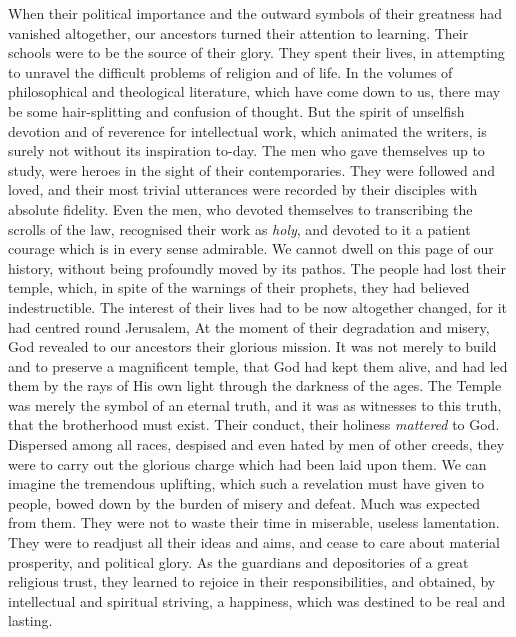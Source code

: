 When their political importance and the
outward symbols of their greatness had
vanished altogether, our ancestors turned
their attention to learning. Their schools
were to be the source of their glory. They
spent their lives, in attempting to unravel the
difficult problems of religion and of life. In
the volumes of philosophical and theological
literature, which have come down to us,
there may be some hair-splitting and confusion
of thought. But the spirit of unselfish
devotion and of reverence for intellectual
work, which animated the writers, is surely
not without its inspiration to-day. The
men who gave themselves up to study, were
heroes in the sight of their contemporaries.
They were followed and loved, and their
most trivial utterances were recorded by
their disciples with absolute fidelity. Even
the men, who devoted themselves to transcribing
the scrolls of the law, recognised
their work as \textsl{holy}, and devoted to it a
patient courage which is in every sense
admirable. We cannot dwell on this page
of our history, without being profoundly
moved by its pathos. The people had lost
their temple, which, in spite of the warnings
of their prophets, they had believed
indestructible. The interest of their lives had
to be now altogether changed, for it had
centred round Jerusalem, At the moment of
their degradation and misery, God revealed to
our ancestors their glorious mission. It was
not merely to build and to preserve a
magnificent temple, that God had kept them
alive, and had led them by the rays of His
own light through the darkness of the ages.
The Temple was merely the symbol of an
eternal truth, and it was as witnesses to this
truth, that the brotherhood must exist.
Their conduct, their holiness \textsl{mattered} to
God. Dispersed among all races, despised
and even hated by men of other creeds,
they were to carry out the glorious charge
which had been laid upon them. We can
imagine the tremendous uplifting, which
such a revelation must have given to people,
bowed down by the burden of misery and
defeat. Much was expected from them.
They were not to waste their time in
miserable, useless lamentation. They were to
readjust all their ideas and aims, and cease
to care about material prosperity, and political
glory. As the guardians and depositories of
a great religious trust, they learned to rejoice
in their responsibilities, and obtained, by
intellectual and spiritual striving, a happiness,
which was destined to be real and lasting.

